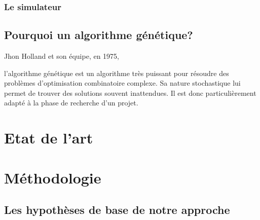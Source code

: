 \documentclass[journal, a4paper]{IEEEtran}
\begin{document}
	\subsubsection{Le simulateur}



	\subsection{Pourquoi un algorithme génétique?}
	Jhon Holland et son équipe, en 1975,~\cite{systems-adaptation}

	l'algorithme génétique
	est un algorithme très puissant pour résoudre des problèmes
	d'optimisation combinatoire complexe.
	Sa nature stochastique lui permet de trouver des solutions souvent
	inattendues. Il est donc particulièrement adapté à la phase de
	recherche d'un projet.


\section{Etat de l'art}



\section{Méthodologie}\label{sec:met}
	\subsection{Les hypothèses de base de notre approche}
\end{document}
